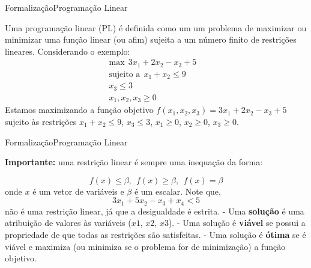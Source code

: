 \documentclass[t]{beamer}
\begin{document}
\begin{ftst}{Formalização}{Programação Linear}

Uma programação linear (PL) é definida como um um problema de maximizar ou minimizar uma função linear (ou afim) sujeita a um número finito de restrições lineares. Considerando o exemplo:
    \begin{equation*}
        \begin{align*}
          \text{max}\ \ 3x_1 + 2x_2 - x_3 + 5 & \\ 
          \text{sujeito a} \ \ x_1 + x_2 \leqslant 9 & \\ 
           x_3 \leq 3 & \\ 
           x_1, x_2, x_3 \geq 0 & 
        \end{align*}
    \end{equation*}
\vone
\small
Estamos maximizando a função objetivo $f(x_1,x_2,x_3) = 3x_1 + 2x_2 - x_3 + 5$ sujeito às restrições $x_1 + x_2 \leqslant 9$, $x_3 \leq 3$, $x_1 \geq 0$, $x_2 \geq 0$, $x_3 \geq 0$.

\end{ftst}


\begin{ftst}{Formalização}{Programação Linear}

\textbf{Importante:} uma restrição linear é sempre uma inequação da forma:

\begin{equation*}
    f(x) \leq \beta, \ \ f(x) \geq \beta, \ \ f(x) = \beta
\end{equation*}
onde $x$ é um vetor de variáveis e $\beta$ é um escalar. Note que,
\begin{equation*}
    3x_1 + 5x_2 - x_3 + x_4 < 5
\end{equation*}
não é uma restrição linear, já que a desigualdade é estrita.
\vone
\small
- Uma \textbf{solução} é uma atribuição de valores às variáveis ($x1$, $x2$, $x3$).
\vone
- Uma solução é \textbf{viável} se possui a propriedade de que todas as restrições são satisfeitas. 
\vone
- Uma solução é \textbf{ótima} se é viável e maximiza (ou minimiza se o problema for de minimização) a função objetivo.

\end{ftst}

\end{document}
